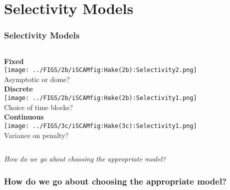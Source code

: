 \documentclass[table]{beamer}
\begin{document}

\section{Selectivity Models} %
\label{sec:Selectivity_Models}

\begin{frame}[m]\frametitle{Selectivity Models}
    
\begin{columns}
		\textbf{Fixed}\\
		\texttt{[image: ../FIGS/2b/iSCAMfig:Hake(2b):Selectivity2.png]}\\
		Asymptotic or dome?\\
	
	
		\textbf{Discrete}\\
		\texttt{[image: ../FIGS/2b/iSCAMfig:Hake(2b):Selectivity1.png]}\\
		Choice of time blocks?\\
	
	
		\textbf{Continuous}\\
		\texttt{[image: ../FIGS/3c/iSCAMfig:Hake(3c):Selectivity1.png]}\\
		Variance on penalty?\\
	
\end{columns}
\vfill
\emph{How do we go about choosing the appropriate model?}
\end{frame}

\begin{frame}[m]\frametitle{How do we go about choosing the appropriate model?}
\end{frame}
\end{document}
